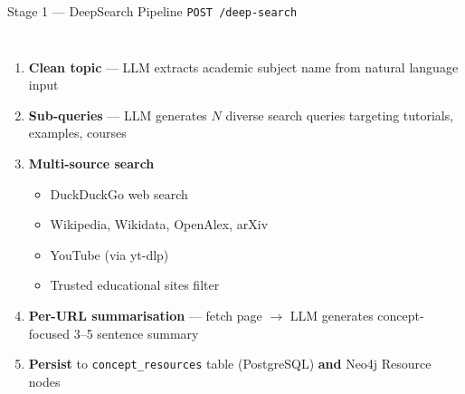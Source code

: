 \documentclass[aspectratio=169,12pt]{beamer}
\begin{document}
\begin{frame}{Stage 1 — DeepSearch Pipeline \texttt{POST /deep-search}}
  \begin{columns}
      \begin{enumerate}\small
        \item \textbf{Clean topic} — LLM extracts academic subject name
              from natural language input
        \item \textbf{Sub-queries} — LLM generates $N$ diverse search
              queries targeting tutorials, examples, courses
        \item \textbf{Multi-source search}
          \begin{itemize}\footnotesize
            \item DuckDuckGo web search
            \item Wikipedia, Wikidata, OpenAlex, arXiv
            \item YouTube (via yt-dlp)
            \item Trusted educational sites filter
          \end{itemize}
        \item \textbf{Per-URL summarisation} — fetch page $\to$ LLM
              generates concept-focused 3–5 sentence summary
        \item \textbf{Persist} to \texttt{concept\_resources} table
              (PostgreSQL) \textbf{and} Neo4j Resource nodes
      \end{enumerate}
  \end{columns}
\end{frame}
\end{document}
